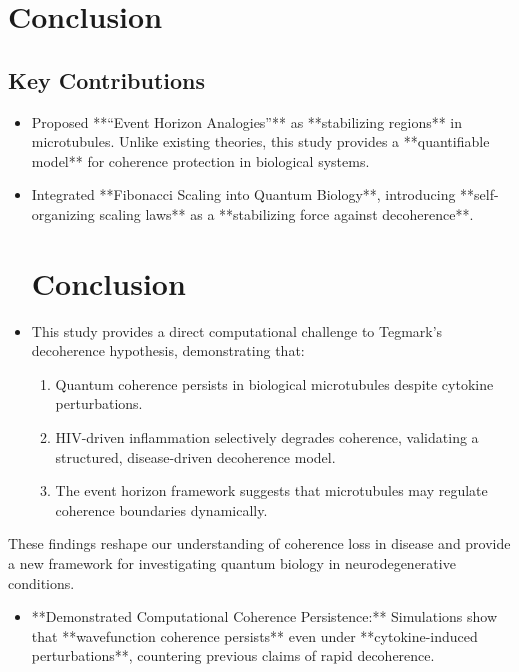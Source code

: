 \documentclass[entropy,article,submit,oneauthor,pdftex,]{Definitions/mdpi}
\begin{document}
\section{Conclusion}
\subsection{Key Contributions}
\begin{itemize}
\item Proposed **“Event Horizon Analogies”** as **stabilizing regions** in microtubules. Unlike existing theories, this study provides a **quantifiable model** for coherence protection in biological systems.
 \item Integrated **Fibonacci Scaling into Quantum Biology**, introducing **self-organizing scaling laws** as a **stabilizing force against decoherence**.
\section{Conclusion}
\item This study provides a direct computational challenge to Tegmark’s decoherence hypothesis, demonstrating that:
\begin{enumerate}
\item Quantum coherence persists in biological microtubules despite cytokine perturbations.
    \item HIV-driven inflammation selectively degrades coherence, validating a structured, disease-driven decoherence model.
    \item The event horizon framework suggests that microtubules may regulate coherence boundaries dynamically.
\end{enumerate}
\end{itemize}
These findings reshape our understanding of coherence loss in disease and provide a new framework for investigating quantum biology in neurodegenerative conditions.
\begin{itemize}
        \item **Demonstrated Computational Coherence Persistence:** Simulations show that **wavefunction coherence persists** even under **cytokine-induced perturbations**, countering previous claims of rapid decoherence.
\end{itemize}
\end{document}
